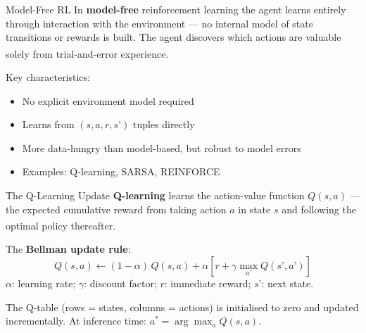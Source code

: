 \begin{v3topic}{Model-Free RL}
    In \textbf{model-free} reinforcement learning the agent learns entirely through
    interaction with the environment --- no internal model of state transitions or
    rewards is built. The agent discovers which actions are valuable solely from
    trial-and-error experience.\textsuperscript{\cite[][p.~348]{hurbansGrokkingArtificialIntelligence2020}}

    Key characteristics:
    \begin{itemize}
        \item No explicit environment model required
        \item Learns from $(s, a, r, s’)$ tuples directly
        \item More data-hungry than model-based, but robust to model errors
        \item Examples: Q-learning, SARSA, REINFORCE
    \end{itemize}

\end{v3topic}
\begin{v3topic}{The Q-Learning Update}
    \textbf{Q-learning} learns the action-value function $Q(s,a)$ --- the expected
    cumulative reward from taking action $a$ in state $s$ and following the
    optimal policy thereafter.\textsuperscript{\cite[][pp.~335--340]{hurbansGrokkingArtificialIntelligence2020}}

    The \textbf{Bellman update rule}:
    \begin{equation}
        Q(s,a) \leftarrow (1{-}\alpha)\,Q(s,a)
                 + \alpha\!\left[r + \gamma \max_{a’} Q(s’,a’)\right]
    \end{equation}
    $\alpha$: learning rate; $\gamma$: discount factor; $r$: immediate reward;
    $s’$: next state.

    The Q-table (rows = states, columns = actions) is initialised to zero and
    updated incrementally. At inference time: $a^* = \arg\max_a Q(s,a)$.

\end{v3topic}
